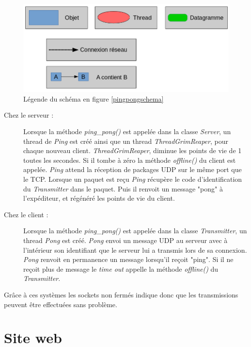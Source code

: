 \documentclass[a4paper,11pt]{report}
\begin{document}
\begin{figure}[th]
      \begin{center}
        \includegraphics[scale=0.3]{Assets/l_r_3.png}
        \caption{Légende du schéma en figure \ref{pingpongschema}}
        \label{pingpongschemalegende}
      \end{center}
\end{figure}


\begin{description}
  \item[Chez le serveur : ]
  Lorsque la méthode \textit{ping\_pong()} est appelée dans la classe \textit{Server}, un thread de \textit{Ping} est créé ainsi que un thread \textit{ThreadGrimReaper}, pour chaque nouveau client. 
\textit{ThreadGrimReaper}, diminue les points de vie de 1 toutes les secondes. Si il tombe à zéro la méthode \textit{offline()} du client est appelée.
\textit{Ping} attend la réception de packages UDP sur le même port que le TCP. Lorsque un paquet est reçu \textit{Ping} récupère le code d’identification du \textit{Transmitter} dans le paquet. Puis il renvoit un message "pong" à l’expéditeur, et régénéré les points de vie du client.
  
  \item[Chez le client : ]
  Lorsque la méthode \textit{ping\_pong()} est appelée dans la classe \textit{Transmitter}, un thread \textit{Pong} est créé. \textit{Pong} envoi un message UDP au serveur avec à l’intérieur son identifiant que le serveur lui a transmis lors de sa connexion. \textit{Pong} renvoit en permanence un message lorsqu’il reçoit "ping". Si il ne reçoit plus de message le \textit{time out} appelle la méthode \textit{offline()} du \textit{Transmitter}.
\end{description}

Grâce à ces systèmes les sockets non fermés indique donc que les transmissions peuvent être effectuées sans problème.


\chapter{Site web}
\end{document}
